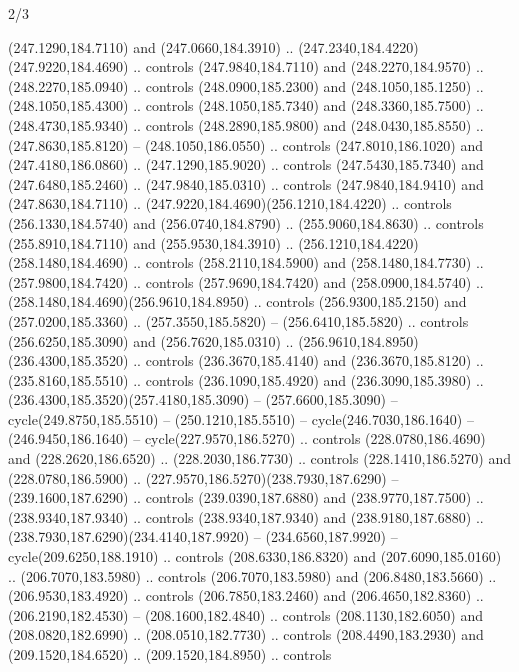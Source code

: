 \begin{flagdescription}{2/3}
\begin{scope}[xshift=0.5\flaglength,yshift=0.5\flagwidth,scale=\flagwidth/259.2]
\begin{scope}[y=0.8pt, x=0.8pt, yscale=-1,shift={(-243,-162)}]
      (247.1290,184.7110) and (247.0660,184.3910) ..
      (247.2340,184.4220)(247.9220,184.4690) .. controls (247.9840,184.7110) and
      (248.2270,184.9570) .. (248.2270,185.0940) .. controls (248.0900,185.2300) and
      (248.1050,185.1250) .. (248.1050,185.4300) .. controls (248.1050,185.7340) and
      (248.3360,185.7500) .. (248.4730,185.9340) .. controls (248.2890,185.9800) and
      (248.0430,185.8550) .. (247.8630,185.8120) -- (248.1050,186.0550) .. controls
      (247.8010,186.1020) and (247.4180,186.0860) .. (247.1290,185.9020) .. controls
      (247.5430,185.7340) and (247.6480,185.2460) .. (247.9840,185.0310) .. controls
      (247.9840,184.9410) and (247.8630,184.7110) ..
      (247.9220,184.4690)(256.1210,184.4220) .. controls (256.1330,184.5740) and
      (256.0740,184.8790) .. (255.9060,184.8630) .. controls (255.8910,184.7110) and
      (255.9530,184.3910) .. (256.1210,184.4220)(258.1480,184.4690) .. controls
      (258.2110,184.5900) and (258.1480,184.7730) .. (257.9800,184.7420) .. controls
      (257.9690,184.7420) and (258.0900,184.5740) ..
      (258.1480,184.4690)(256.9610,184.8950) .. controls (256.9300,185.2150) and
      (257.0200,185.3360) .. (257.3550,185.5820) -- (256.6410,185.5820) .. controls
      (256.6250,185.3090) and (256.7620,185.0310) ..
      (256.9610,184.8950)(236.4300,185.3520) .. controls (236.3670,185.4140) and
      (236.3670,185.8120) .. (235.8160,185.5510) .. controls (236.1090,185.4920) and
      (236.3090,185.3980) .. (236.4300,185.3520)(257.4180,185.3090) --
      (257.6600,185.3090) -- cycle(249.8750,185.5510) -- (250.1210,185.5510) --
      cycle(246.7030,186.1640) -- (246.9450,186.1640) -- cycle(227.9570,186.5270) ..
      controls (228.0780,186.4690) and (228.2620,186.6520) .. (228.2030,186.7730) ..
      controls (228.1410,186.5270) and (228.0780,186.5900) ..
      (227.9570,186.5270)(238.7930,187.6290) -- (239.1600,187.6290) .. controls
      (239.0390,187.6880) and (238.9770,187.7500) .. (238.9340,187.9340) .. controls
      (238.9340,187.9340) and (238.9180,187.6880) ..
      (238.7930,187.6290)(234.4140,187.9920) -- (234.6560,187.9920) --
      cycle(209.6250,188.1910) .. controls (208.6330,186.8320) and
      (207.6090,185.0160) .. (206.7070,183.5980) .. controls (206.7070,183.5980) and
      (206.8480,183.5660) .. (206.9530,183.4920) .. controls (206.7850,183.2460) and
      (206.4650,182.8360) .. (206.2190,182.4530) -- (208.1600,182.4840) .. controls
      (208.1130,182.6050) and (208.0820,182.6990) .. (208.0510,182.7730) .. controls
      (208.4490,183.2930) and (209.1520,184.6520) .. (209.1520,184.8950) .. controls

\end{scope}
\end{scope}
\end{flagdescription}
